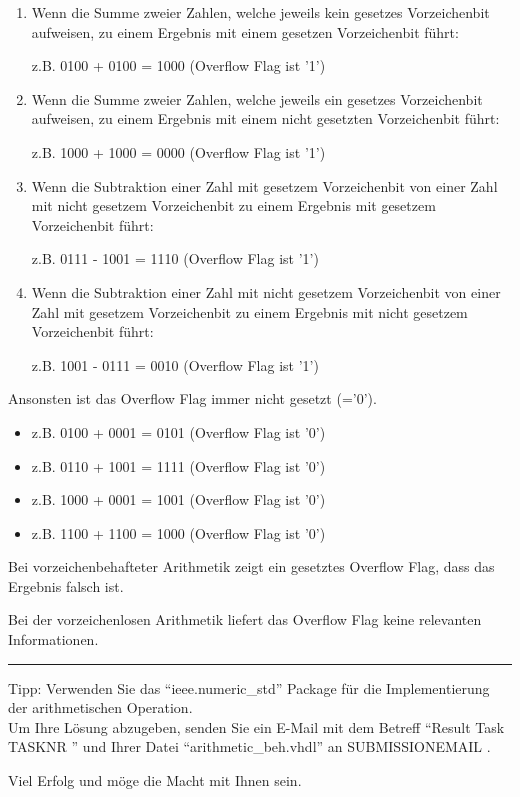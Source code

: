 \documentclass[a4paper,12pt]{article}
\begin{document}
\begin{enumerate}
\item Wenn die Summe zweier Zahlen, welche jeweils kein gesetzes Vorzeichenbit aufweisen, zu einem Ergebnis mit einem gesetzen Vorzeichenbit f\"uhrt:

   z.B. 0100 + 0100 = 1000 (Overflow Flag ist '1')

\item Wenn die Summe zweier Zahlen, welche jeweils ein gesetzes Vorzeichenbit aufweisen, zu einem Ergebnis mit einem nicht gesetzten Vorzeichenbit f\"uhrt:

   z.B. 1000 + 1000 = 0000 (Overflow Flag ist '1')

\item Wenn die Subtraktion einer Zahl mit gesetzem Vorzeichenbit von einer Zahl mit nicht gesetzem Vorzeichenbit zu einem Ergebnis mit gesetzem Vorzeichenbit f\"uhrt:

   z.B. 0111 - 1001 = 1110 (Overflow Flag ist '1')

\item Wenn die Subtraktion einer Zahl mit nicht gesetzem Vorzeichenbit von einer Zahl mit gesetzem Vorzeichenbit zu einem Ergebnis mit nicht gesetzem Vorzeichenbit f\"uhrt:

   z.B. 1001 - 0111 = 0010 (Overflow Flag ist '1')
\end{enumerate}

Ansonsten ist das Overflow Flag immer nicht gesetzt (='0').

\begin{itemize}
\item z.B. 0100 + 0001 = 0101 (Overflow Flag ist '0')
\item z.B. 0110 + 1001 = 1111 (Overflow Flag ist '0')
\item z.B. 1000 + 0001 = 1001 (Overflow Flag ist '0')
\item z.B. 1100 + 1100 = 1000 (Overflow Flag ist '0')
\end{itemize}


Bei vorzeichenbehafteter Arithmetik zeigt ein gesetztes Overflow Flag, dass das Ergebnis falsch ist. 

Bei der vorzeichenlosen Arithmetik liefert das Overflow Flag keine relevanten Informationen.

\rule{16cm}{0.4pt}

\vspace{0.3cm}

Tipp: Verwenden Sie das "`ieee.numeric\_std"' Package f\"ur die Implementierung der arithmetischen Operation.
\\

Um Ihre L\"osung abzugeben, senden Sie ein E-Mail mit dem Betreff "`Result Task {{ TASKNR }}"' und Ihrer Datei "`arithmetic\_beh.vhdl"' an {{ SUBMISSIONEMAIL }}.

\vspace{0.7cm}

Viel Erfolg und m\"oge die Macht mit Ihnen sein.
\end{document}
